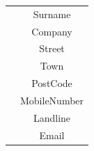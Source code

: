 \begin{center}
\begin{tabular}{|c|c|}
                                   & Surname                       \\
                                   & Company                       \\
                                   & Street                        \\
                                   & Town                          \\
                                   & PostCode                      \\ 
                                   & MobileNumber                  \\
                                   & Landline                      \\ 
                                   & Email                         \\ \hline                     
    \end{tabular}
\end{center}

